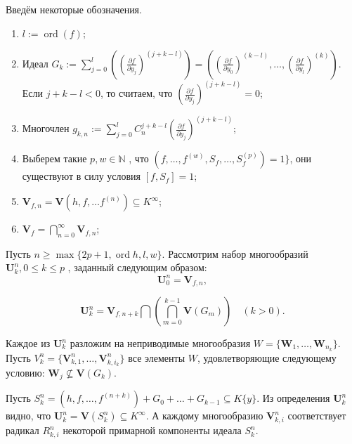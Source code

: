 \documentclass[16pt]{article}
\DeclareMathOperator{\ord}{ord}
\theoremstyle{plain1}
\theoremstyle{plain2}
\theoremstyle{plain}
\theoremstyle{plain3}
\theoremstyle{definition}
\theoremstyle{remark}
\begin{document}
Введём некоторые обозначения.
\begin{enumerate}


  \item  $l:=\ord (f);$

  \item Идеал $G_k := \sum\limits_{j=0}^l\left(\left(\frac{\partial f}{\partial y_j}\right)^{(j+k-l)}\right) = \left(\left(\frac{\partial f}{\partial y_0}\right)^{(k-l)},\ldots ,\left(\frac{\partial f}{\partial y_l}\right)^{(k)} \right)$.
  \\Если $j+k-l<0$, то считаем, что $\left(\frac{\partial f}{\partial y_j}\right)^{(j+k-l)} = 0$;

  \item Многочлен $g_{k,n}:=\sum\limits_{j=0}^{l}C_n^{j+k - l }\left(\frac{\partial f}{\partial y_j}\right)^{(j+k - l)}$;

  \item  Выберем  такие $p,w\in \mathbb{N}$ , что $(f,\ldots,f^{(w)},S_f,\ldots,S_f^{(p)})=1\}$, они существуют в силу условия
  $[f,S_f]=1$;

  \item $\mathbf{V}_{f,n}=\mathbf{V}(h,f,\ldots f^{(n)})\subseteq K^{\infty}$;

  \item
  $\mathbf{V}_{f}=\bigcap\limits_{n=0}^{\infty}\mathbf{V}_{f,n}$;


\end{enumerate}



Пусть $n \geqslant\max\{ 2p+1,\ord{h},l,w\}$. Рассмотрим  набор многообразий $\mathbf{U}_k^n,0\leqslant k\leqslant p $ , заданный следующим образом:
$$
\mathbf{U}_{0}^n=\mathbf{V}_{f,n},
$$

$$\mathbf{U}_k^n=\mathbf{V}_{f,n+k}\bigcap\left(\bigcap\limits_{m=0}^{k-1}\mathbf{V}\left(G_m\right)\right)
\quad (k>0).
$$

Каждое из $\mathbf{U}^n_k$ разложим на неприводимые многообразия $W=\{\mathbf{W}_{1},\ldots,\mathbf{W}_{n_k}\}$. Пусть $V^n_k=\{\mathbf{V}^n_{k,1},\ldots,\mathbf{V}^n_{k,i_k}\}$ все элементы $W$, удовлетворяющие следующему условию: $\mathbf{W}_{j}\not\subseteq\mathbf{V}(G_k)$.

Пусть  $S_k^n=(h,f,\ldots,f^{(n+k)})+G_0+\ldots+ G_{k-1}\subseteq K\{y\}$. Из определения $\mathbf{U}_k^n$ видно, что $\mathbf{U}_k^n=\mathbf{V}(S_k^n)\subseteq K^{\infty}$. А каждому многообразию $\mathbf{V}_{k,i}^n$ соответствует радикал $R_{k,i}^n$ некоторой примарной компоненты идеала $S_k^n$.
\end{document}
